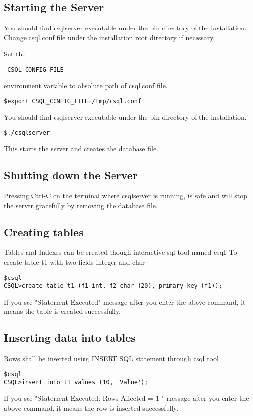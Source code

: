 \documentclass[12pt]{article}
\begin{document}
\subsection{Starting the Server}
\label{startserver}
You should find csqlserver executable under the bin directory of the installation.
Change csql.conf file under the installation root directory if necessary.

Set the \begin{verbatim} CSQL_CONFIG_FILE \end{verbatim} environment variable to absolute path of csql.conf file.

\begin{verbatim}
$export CSQL_CONFIG_FILE=/tmp/csql.conf
\end{verbatim}

You should find csqlserver executable under the bin directory of the installation.
\begin{verbatim}
$./csqlserver
\end{verbatim}

This starts the server and creates the database file.

\subsection{Shutting down the Server}
\label{shutserver}
Pressing Ctrl-C on the terminal where csqlserver is running, is safe and will stop the server gracefully by removing the database file.

\subsection{Creating tables}
\label{creatingtables}
Tables and Indexes can be created though interactive sql tool named csql.
To create table t1 with two fields integer and char
\begin{verbatim}
$csql
CSQL>create table t1 (f1 int, f2 char (20), primary key (f1));
\end{verbatim}
If you see "Statement Executed" message after you enter the above command, it means the table is created successfully.

\subsection{Inserting data into tables}
\label{insertingdata}
Rows shall be inserted using INSERT SQL statement through csql tool
\begin{verbatim}
$csql
CSQL>insert into t1 values (10, 'Value');

\end{verbatim}
If you see "Statement Executed: Rows Affected = 1 " message after you enter the above command, it means the row is inserted successfully.
\end{document}
